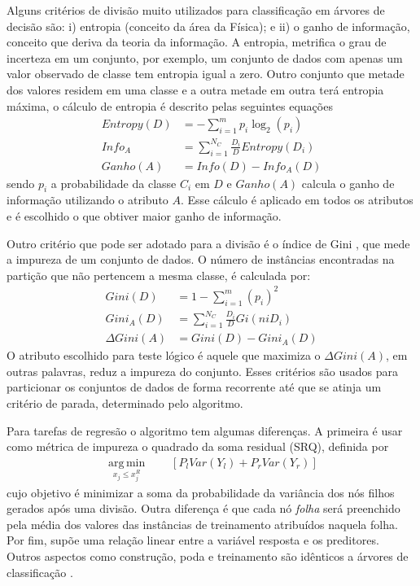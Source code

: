 Alguns critérios de divisão muito utilizados para classificação em árvores de decisão são: i) entropia (conceito da área da Física); e ii) o ganho de informação, conceito que deriva da teoria da informação. A entropia, metrifica o grau de incerteza em um conjunto, por exemplo, um conjunto de dados com apenas um valor observado de classe tem entropia igual a zero. Outro conjunto que metade dos valores residem em uma classe e a outra metade em outra terá entropia máxima, o cálculo de entropia \cite{HanKamber2011} é descrito pelas seguintes equações
\begin{align}
Entropy(D) &= - \sum\limits_{i=1}^{m}p_{i}\log_{2}(p_{i})\label{EQ_Entropia_Ganho_Informacao} \\
Info_{A} &= \sum\limits_{i=1}^{N_{C}}\frac{D_{i}}{D}Entropy(D_{i})\label{EQ_Informacao_AtributoA_Ganho_Informacao}\\
Ganho(A) &= Info(D) - Info_{A}(D)\label{EQ_Ganho_Ganho_Informacao}
\end{align}
sendo \(p_{i}\) a probabilidade da classe \(C_{i}\) em \(D\) e \(Ganho(A)\) calcula o ganho de informação utilizando o atributo \(A\). Esse cálculo é aplicado em todos os atributos e é escolhido o que obtiver maior ganho de informação.

Outro critério que pode ser adotado para a divisão é o índice de Gini \cite{HanKamber2011}, que mede a impureza de um conjunto de dados. O número de instâncias encontradas na partição que não pertencem a mesma classe, é calculada por:
\begin{align}
Gini(D) &= 1 - \sum\limits_{i=1}^{m}(p_{i})^{2}\label{EQ_Gini_01} \\
Gini_{A}(D) &= \sum\limits_{i=1}^{N_{C}}\frac{D_{i}}{D}Gi(niD_{i})\label{EQ_Gini_02} \\
\Delta Gini(A) &= Gini(D) - Gini_{A}(D)\label{EQ_Gini_03}
\end{align}
O atributo escolhido para teste lógico é aquele que maximiza o \(\Delta Gini(A)\), em outras palavras, reduz a impureza do conjunto. Esses critérios são usados para particionar os conjuntos de dados de forma recorrente até que se atinja um critério de parada, determinado pelo algoritmo. 

Para tarefas de regresão o algoritmo tem algumas diferenças. A primeira é usar como métrica de impureza o quadrado da soma residual (SRQ), definida por
\begin{align}
\operatorname*{arg\,min}_{x_{j} \leq x_{j}^{R}} \qquad [P_{l}Var(Y_{l}) + P_{r}Var(Y_{r})]
\end{align}
cujo objetivo é minimizar a soma da probabilidade da variância dos nós filhos gerados após uma divisão. Outra diferença é que cada nó \emph{folha} será preenchido pela média dos valores das instâncias de treinamento atribuídos naquela folha. Por fim, supõe uma relação linear entre a variável resposta e os preditores. Outros aspectos como construção, poda e treinamento são idênticos a árvores de classificação \cite{Connor2007}.


